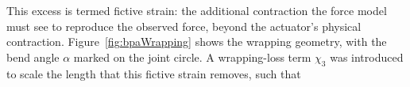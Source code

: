 This excess is termed fictive strain: the additional contraction the force model must see to reproduce the observed force, beyond the actuator's physical contraction. Figure~\ref{fig:bpaWrapping} shows the wrapping geometry, with the bend angle $\alpha$ marked on the joint circle. A wrapping-loss term $\chi_{3}$ was introduced to scale the length that this fictive strain removes, such that
